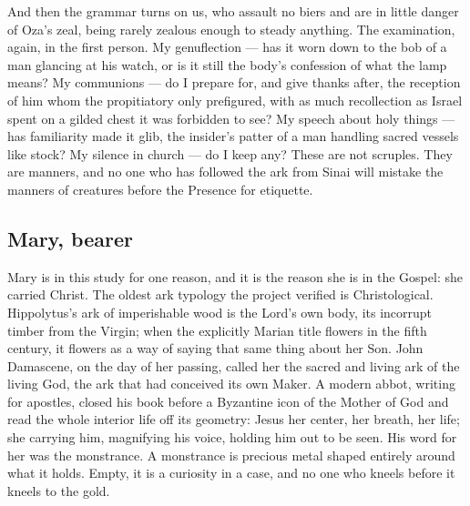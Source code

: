And then the grammar turns on us, who assault no biers and are in
little danger of Oza's zeal, being rarely zealous enough to steady
anything. The examination, again, in the first person. My genuflection
--- has it worn down to the bob of a man glancing at his watch, or is
it still the body's confession of what the lamp means? My communions
--- do I prepare for, and give thanks after, the reception of him whom
the propitiatory only prefigured, with as much recollection as Israel
spent on a gilded chest it was forbidden to see? My speech about holy
things --- has familiarity made it glib, the insider's patter of a man
handling sacred vessels like stock? My silence in church --- do I keep
any? These are not scruples. They are manners, and no one who has
followed the ark from Sinai will mistake the manners of creatures
before the Presence for etiquette.

\subsection{Mary, bearer}

Mary is in this study for one reason, and it is the reason she is in
the Gospel: she carried Christ. The oldest ark typology the project
verified is Christological. Hippolytus's ark of imperishable wood is
the Lord's own body, its incorrupt timber from the Virgin; when the
explicitly Marian title flowers in the fifth century, it flowers as a
way of saying that same thing about her Son. John Damascene, on the
day of her passing, called her the sacred and living ark of the living
God, the ark that had conceived its own Maker. A modern abbot, writing for apostles, closed his book
before a Byzantine icon of the Mother of God and read the whole
interior life off its geometry: Jesus her center, her breath, her
life; she carrying him, magnifying his voice, holding him out to be
seen. His word for her was the monstrance. A monstrance is precious metal shaped
entirely around what it holds. Empty, it is a curiosity in a case, and
no one who kneels before it kneels to the gold.

